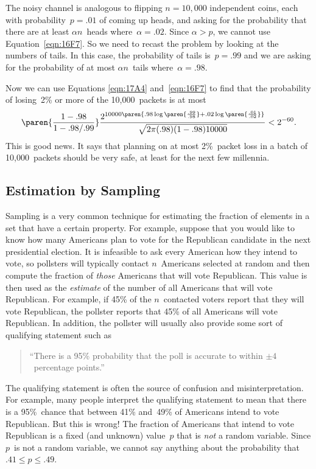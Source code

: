 The noisy channel is analogous to flipping $n = 10{,}000$ independent
coins, each with probability~$p = .01$ of coming up heads, and asking
for the probability that there are at least $\alpha n$~heads
where~$\alpha = .02$.  Since $\alpha > p$, we cannot use
Equation~\ref{eqn:16F7}.  So we need to recast the problem by looking
at the numbers of tails.  In this case, the probability of tails is~$p
= .99$ and we are asking for the probability of at most $\alpha
n$~tails where~$\alpha = .98$.

Now we can use Equations \ref{eqn:17A4} and~\ref{eqn:16F7} to find
that the probability of losing~2\% or more of the 10,000~packets is at
most
\begin{equation*}
    \paren{\frac{1 - .98}{1 - .98/.99}}
    \frac{ 2^{10000\paren{.98 \log\paren{\frac{.99}{.98}}
                        + .02 \log\paren{\frac{.01}{.02}}} } }
         {\sqrt{2\pi (.98)(1 - .98) 10000}}
    < 2^{-60}.
\end{equation*}
This is good news.  It says that planning on at most 2\%~packet loss
in a batch of 10,000~packets should be very safe, at least for the
next few millennia.

\subsection{Estimation by Sampling}

Sampling is a very common technique for estimating the fraction of
elements in a set that have a certain property.  For example, suppose
that you would like to know how many Americans plan to vote for the
Republican candidate in the next presidential election.  It is
infeasible to ask every American how they intend to vote, so pollsters
will typically contact $n$~Americans selected at random and then
compute the fraction of \emph{those} Americans that will vote
Republican.  This value is then used as the \emph{estimate} of the
number of all Americans that will vote Republican.  For example, if
45\% of the $n$~contacted voters report that they will vote
Republican, the pollster reports that 45\% of all Americans will vote
Republican.  In addition, the pollster will usually also provide some
sort of qualifying statement such as
\begin{quote}
``There is a 95\% probability that the poll is accurate to within $\pm
  4$~percentage points.''
\end{quote}

The qualifying statement is often the source of confusion and
misinterpretation.  For example, many people interpret the qualifying
statement to mean that there is a 95\%~chance that between 41\%
and~49\% of Americans intend to vote Republican.  But this is wrong!
The fraction of Americans that intend to vote Republican is a fixed
(and unknown) value~$p$ that is \emph{not} a random variable.  Since
$p$~is not a random variable, we cannot say anything about the
probability that $.41 \le p \le .49$.


